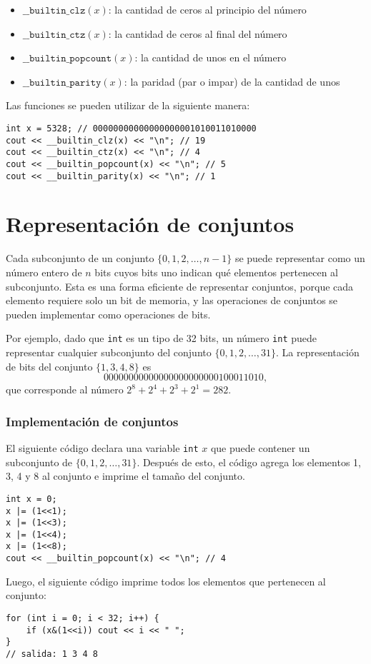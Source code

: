 \begin{itemize}
\item
$\texttt{\_\_builtin\_clz}(x)$:
la cantidad de ceros al principio del número
\item
$\texttt{\_\_builtin\_ctz}(x)$:
la cantidad de ceros al final del número
\item
$\texttt{\_\_builtin\_popcount}(x)$:
la cantidad de unos en el número
\item
$\texttt{\_\_builtin\_parity}(x)$:
la paridad (par o impar) de la cantidad de unos
\end{itemize}
\begin{samepage}

Las funciones se pueden utilizar de la siguiente manera:
\begin{lstlisting}
int x = 5328; // 00000000000000000001010011010000
cout << __builtin_clz(x) << "\n"; // 19
cout << __builtin_ctz(x) << "\n"; // 4
cout << __builtin_popcount(x) << "\n"; // 5
cout << __builtin_parity(x) << "\n"; // 1
\end{lstlisting}
\end{samepage}

\section{Representación de conjuntos}

Cada subconjunto de un conjunto
$\{0,1,2,\ldots,n-1\}$
se puede representar como un número entero de $n$ bits
cuyos bits uno indican qué
elementos pertenecen al subconjunto.
Esta es una forma eficiente de representar conjuntos,
porque cada elemento requiere solo un bit de memoria,
y las operaciones de conjuntos se pueden implementar como operaciones de bits.

Por ejemplo, dado que \texttt{int} es un tipo de 32 bits,
un número \texttt{int} puede representar cualquier subconjunto
del conjunto $\{0,1,2,\ldots,31\}$.
La representación de bits del conjunto $\{1,3,4,8\}$ es
\[00000000000000000000000100011010,\]
que corresponde al número $2^8+2^4+2^3+2^1=282$.

\subsubsection{Implementación de conjuntos}

El siguiente código declara una variable \texttt{int}
$x$ que puede contener
un subconjunto de $\{0,1,2,\ldots,31\}$.
Después de esto, el código agrega los elementos 1, 3, 4 y 8
al conjunto e imprime el tamaño del conjunto.
\begin{lstlisting}
int x = 0;
x |= (1<<1);
x |= (1<<3);
x |= (1<<4);
x |= (1<<8);
cout << __builtin_popcount(x) << "\n"; // 4
\end{lstlisting}
Luego, el siguiente código imprime todos
los elementos que pertenecen al conjunto:
\begin{lstlisting}
for (int i = 0; i < 32; i++) {
    if (x&(1<<i)) cout << i << " ";
}
// salida: 1 3 4 8
\end{lstlisting}

